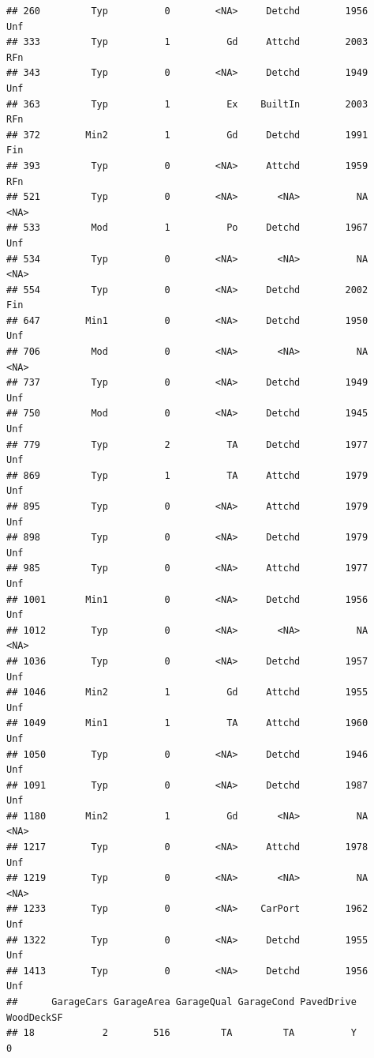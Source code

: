 \documentclass[]{article}
\begin{document}
\begin{verbatim}
## 260         Typ          0        <NA>     Detchd        1956          Unf
## 333         Typ          1          Gd     Attchd        2003          RFn
## 343         Typ          0        <NA>     Detchd        1949          Unf
## 363         Typ          1          Ex    BuiltIn        2003          RFn
## 372        Min2          1          Gd     Detchd        1991          Fin
## 393         Typ          0        <NA>     Attchd        1959          RFn
## 521         Typ          0        <NA>       <NA>          NA         <NA>
## 533         Mod          1          Po     Detchd        1967          Unf
## 534         Typ          0        <NA>       <NA>          NA         <NA>
## 554         Typ          0        <NA>     Detchd        2002          Fin
## 647        Min1          0        <NA>     Detchd        1950          Unf
## 706         Mod          0        <NA>       <NA>          NA         <NA>
## 737         Typ          0        <NA>     Detchd        1949          Unf
## 750         Mod          0        <NA>     Detchd        1945          Unf
## 779         Typ          2          TA     Detchd        1977          Unf
## 869         Typ          1          TA     Attchd        1979          Unf
## 895         Typ          0        <NA>     Attchd        1979          Unf
## 898         Typ          0        <NA>     Detchd        1979          Unf
## 985         Typ          0        <NA>     Attchd        1977          Unf
## 1001       Min1          0        <NA>     Detchd        1956          Unf
## 1012        Typ          0        <NA>       <NA>          NA         <NA>
## 1036        Typ          0        <NA>     Detchd        1957          Unf
## 1046       Min2          1          Gd     Attchd        1955          Unf
## 1049       Min1          1          TA     Attchd        1960          Unf
## 1050        Typ          0        <NA>     Detchd        1946          Unf
## 1091        Typ          0        <NA>     Detchd        1987          Unf
## 1180       Min2          1          Gd       <NA>          NA         <NA>
## 1217        Typ          0        <NA>     Attchd        1978          Unf
## 1219        Typ          0        <NA>       <NA>          NA         <NA>
## 1233        Typ          0        <NA>    CarPort        1962          Unf
## 1322        Typ          0        <NA>     Detchd        1955          Unf
## 1413        Typ          0        <NA>     Detchd        1956          Unf
##      GarageCars GarageArea GarageQual GarageCond PavedDrive WoodDeckSF
## 18            2        516         TA         TA          Y          0

\end{verbatim}
\end{document}

